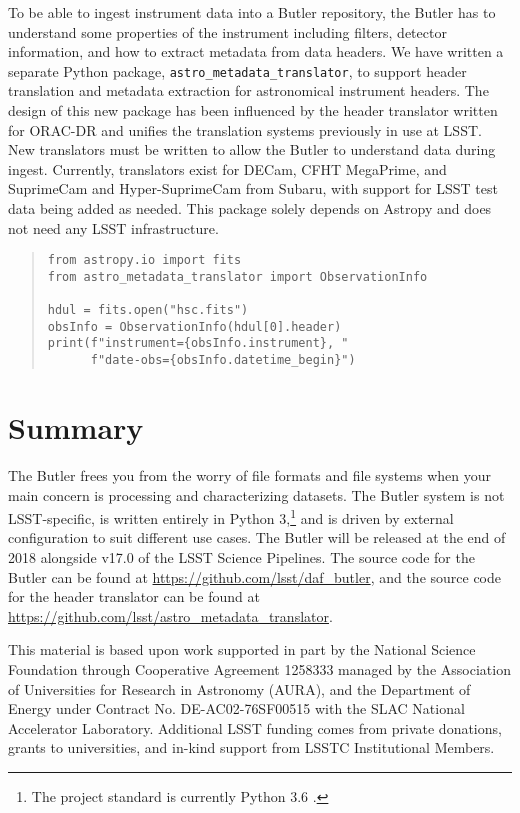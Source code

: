 \documentclass[11pt,twoside]{article}
\begin{document}
To be able to ingest instrument data into a Butler repository, the Butler has to understand some properties of the instrument including filters, detector information, and how to extract metadata from data headers.
We have written a separate Python package, \texttt{astro\_metadata\_translator}, to support header translation and metadata extraction for astronomical instrument headers.
The design of this new package has been influenced by the header translator written for ORAC-DR \citep{2015A&C.....9...40J} and unifies the translation systems previously in use at LSST.
New translators must be written to allow the Butler to understand data during ingest.
Currently, translators exist for DECam, CFHT MegaPrime, and SuprimeCam and Hyper-SuprimeCam from Subaru, with support for LSST test data being added as needed.
This package solely depends on Astropy \citep{2018AJ....156..123A} and does not need any LSST infrastructure.

\begin{quote}
\begin{small}
\begin{verbatim}
from astropy.io import fits
from astro_metadata_translator import ObservationInfo

hdul = fits.open("hsc.fits")
obsInfo = ObservationInfo(hdul[0].header)
print(f"instrument={obsInfo.instrument}, "
      f"date-obs={obsInfo.datetime_begin}")
\end{verbatim}
\end{small}
\end{quote}

\section{Summary}

The Butler frees you from the worry of file formats and file systems when your main concern is processing and characterizing datasets.
The Butler system is not LSST-specific, is written entirely in Python 3,\footnote{The project standard is currently Python 3.6 \citep{P9-123_adassxxvii}.} and is driven by external configuration to suit different use cases.
The Butler will be released at the end of 2018 alongside v17.0 of the LSST Science Pipelines.
The source code for the Butler can be found at \url{https://github.com/lsst/daf_butler}, and the source code for the header translator can be found at \url{https://github.com/lsst/astro_metadata_translator}.


\acknowledgements This material is based upon work supported in part by the National Science Foundation through Cooperative Agreement 1258333 managed by the Association of Universities for Research in Astronomy (AURA), and the Department of Energy under Contract No. DE-AC02-76SF00515 with the SLAC National Accelerator Laboratory.
Additional LSST funding comes from private donations, grants to universities, and in-kind support from LSSTC Institutional Members.

\end{document}
